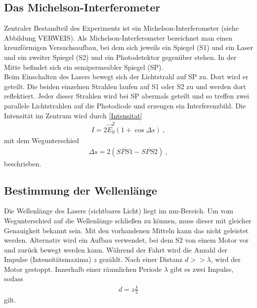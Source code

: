 \subsection*{Das Michelson-Interferometer}
%
Zentraler Bestandteil des Experiments ist ein Michelson-Interferometer (siehe Abbildung VERWEIS). Als Michelson-Interferometer bezeichnet man einen kreuzförmigen Versuchsaufbau, bei dem sich jeweils ein Spiegel (S1) und ein Laser und ein zweiter Spiegel (S2) und ein Photodetektor gegenüber stehen. In der Mitte befindet sich ein semipermeabler Spiegel (SP). \\
Beim Einschalten des Lasers bewegt sich der Lichtstrahl auf SP zu. Dort wird er geteilt. Die beiden einzelnen Strahlen laufen auf S1 oder S2 zu und werden dort reflektiert. Jeder dieser Strahlen wird bei SP abermals geteilt und so treffen zwei parallele Lichtstrahlen auf die Photodiode und erzeugen ein Interferenzbild. Die Intensität im Zentrum wird durch \eqref{Intensitat}
\begin{align}
	I = 2\vec{E}_0^2\left(1+\cos\Delta s\right) \ ,
\end{align}
mit dem Wegunterschied
\begin{align}
	\Delta s = 2(\overline{SPS1}-\overline{SPS2}) \ ,
\end{align}
beschrieben.
\subsection*{Bestimmung der Wellenlänge}
Die Wellenlänge des Lasers (sichtbares Licht) liegt im \si{nm}-Bereich. Um vom Wegunterschied auf die Wellenlänge schließen zu können, muss dieser mit gleicher Genauigkeit bekannt sein. Mit den vorhandenen Mitteln kann das nicht geleistet werden. Alternativ wird ein Aufbau verwendet, bei dem S2 von einem Motor vor und zurück bewegt werden kann. Während der Fahrt wird die Anzahl der Impulse (Intensitätsmaxima) $z$ gezählt. Nach einer Distanz $d >> \lambda$, wird der Motor gestoppt. Innerhalb einer räumlichen Periode $\lambda$ gibt es zwei Impulse, sodass
\begin{align}\label{Wellenlange}
	d = z\frac{\lambda}{2}
\end{align}
gilt.

